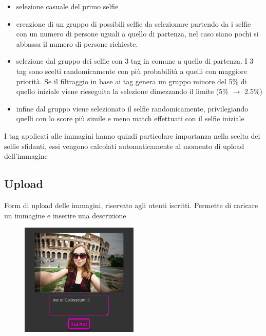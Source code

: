 \documentclass{article}
\begin{document}
\begin{itemize}
\item selezione casuale del primo selfie
\item creazione di un gruppo di possibili selfie da selezionare partendo da i selfie con un numero di persone uguali a
quello di partenza, nel caso siano pochi si abbassa il numero di persone richieste.
\item selezione dal gruppo dei selfie con 3 tag in comune a quello di partenza. I 3 tag sono scelti randomicamente con
più probabilità a quelli con maggiore priorità. Se il filtraggio in base ai tag genera un gruppo minore del 5\% di quello
iniziale viene rieseguita la selezione dimezzando il limite (5\% $\to$ 2.5\%)
\item infine dal gruppo viene selezionato il selfie randomicamente, privilegiando quelli con lo score più simile e meno
match effettuati con il selfie iniziale
\end{itemize}
I tag applicati alle immagini hanno quindi particolare importanza nella scelta dei selfie sfidanti, essi vengono calcolati
automaticamente al momento di upload dell'immagine

\subsection{Upload}
Form di upload delle immagini, riservato agli utenti iscritti.
Permette di caricare un immagine e inserire una descrizione\\

\begin{figure}
\includegraphics[width=0.5\textwidth]{res/upload.png}
\end{figure} 
\end{document}
